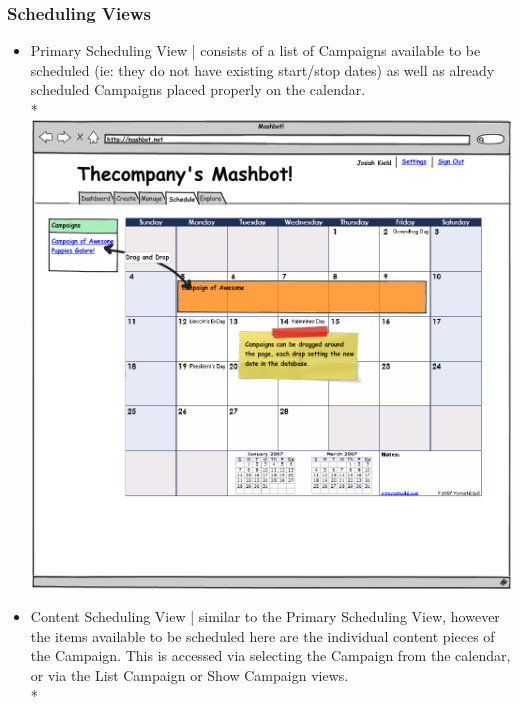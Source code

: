 \documentclass{article}
\begin{document}
\subsubsection{Scheduling Views}
\begin{itemize}
  \item Primary Scheduling View |  consists of a list of Campaigns available to be scheduled (ie: they do not have existing start/stop dates) as well as already scheduled Campaigns placed properly on the calendar. \\*
  \includegraphics[width=\textwidth]{../mockups/schedule.png}
  \item Content Scheduling View | similar to the Primary Scheduling View, however the items available to be scheduled here are the individual content pieces of the Campaign.  This is accessed via selecting the Campaign from the calendar, or via the List Campaign or Show Campaign views. \\*

\end{itemize}
\end{document}
